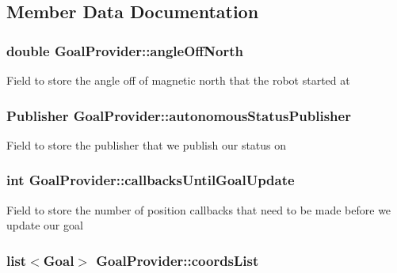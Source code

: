 \subsection{\-Member \-Data \-Documentation}
\hypertarget{classGoalProvider_a165b0eda7247ff32649b097a3e2d160a}{
\subsubsection[{angle\-Off\-North}]{\setlength{\rightskip}{0pt plus 5cm}double {\bf \-Goal\-Provider\-::angle\-Off\-North}}}\label{classGoalProvider_a165b0eda7247ff32649b097a3e2d160a}
\-Field to store the angle off of magnetic north that the robot started at \hypertarget{classGoalProvider_a8827c194d8a7568578307c30b5947276}{
\subsubsection[{autonomous\-Status\-Publisher}]{\setlength{\rightskip}{0pt plus 5cm}\-Publisher {\bf \-Goal\-Provider\-::autonomous\-Status\-Publisher}}}\label{classGoalProvider_a8827c194d8a7568578307c30b5947276}
\-Field to store the publisher that we publish our status on \hypertarget{classGoalProvider_a7ac4fe26923010d8bcb85fd50b90e259}{
\subsubsection[{callbacks\-Until\-Goal\-Update}]{\setlength{\rightskip}{0pt plus 5cm}int {\bf \-Goal\-Provider\-::callbacks\-Until\-Goal\-Update}}}\label{classGoalProvider_a7ac4fe26923010d8bcb85fd50b90e259}
\-Field to store the number of position callbacks that need to be made before we update our goal \hypertarget{classGoalProvider_a81829c05683244c4450e548129e4cb1d}{
\subsubsection[{coords\-List}]{\setlength{\rightskip}{0pt plus 5cm}list$<${\bf \-Goal}$>$ {\bf \-Goal\-Provider\-::coords\-List}}}\label{classGoalProvider_a81829c05683244c4450e548129e4cb1d}
